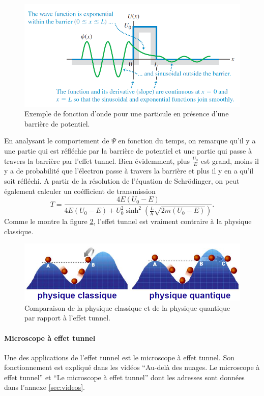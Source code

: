 \begin{figure}[ht]
	\centering
	\includegraphics[scale=0.6]{img/barriere.png}
	\caption{Exemple de fonction d'onde pour une particule
	en présence d'une barrière de potentiel.}
	\label{fig:barriere}
\end{figure}

En analysant le comportement de $\Psi$ en fonction du temps,
on remarque qu'il y a
une partie qui est réfléchie par la barrière de potentiel et
une partie qui passe à travers la barrière par l'effet tunnel.
Bien évidemment, plus $\frac{U_0}{E}$ est grand,
moins il y a de probabilité que l'électron passe à travers la barrière
et plus il y en a qu'il soit réfléchi.
A partir de la résolution de l'équation de Schrödinger, on
peut également calculer un coéfficient de transmission
\[ T = \frac{4E(U_0-E)}{4E(U_0-E)+U_0^2\sinh^2(\frac{L}{h}\sqrt{2m(U_0-E)})}.\]
Comme le montre la figure \ref{fig:tunnel}, l'effet
tunnel est vraiment contraire à la physique classique.

\begin{figure}[ht]
	\centering
	\includegraphics[scale=0.8]{img/tunnel.png}
	\caption{Comparaison de la physique classique et
	de la physique quantique par rapport à l'effet
	tunnel.}
	\label{fig:tunnel}
\end{figure}

\paragraph{Microscope à effet tunnel}
Une des applications de l'effet tunnel est le
microscope à effet tunnel. Son fonctionnement est expliqué dans
les vidéos ``Au-delà des nuages. Le microscope à effet tunnel''
et ``Le microscope à effet tunnel'' dont les adresses sont
données dans l'annexe \ref{sec:videos}.

